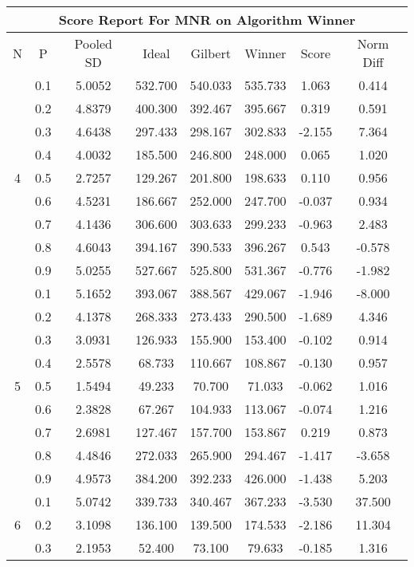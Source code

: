 \documentclass[11pt,a4paper]{report}
\begin{document}
\begin{longtable}{ | c | c || c | c | c | c | c | c | }
\hline
\multicolumn{8}{|c|}{ Score Report For MNR on Algorithm Winner} \\
\hline
N & P & Pooled SD &  Ideal &  Gilbert & Winner  & Score & Norm Diff \\
 \hline
 \hline
 \endhead
\multirow{9}{*}{4} & 0.1 & 5.0052 & 532.700 & 540.033 & 535.733 & 1.063 & 0.414 \\
 & 0.2 & 4.8379 & 400.300 & 392.467 & 395.667 & 0.319 & 0.591 \\
 & 0.3 & 4.6438 & 297.433 & 298.167 & 302.833 & -2.155 & 7.364 \\
 & 0.4 & 4.0032 & 185.500 & 246.800 & 248.000 & 0.065 & 1.020 \\
 & 0.5 & 2.7257 & 129.267 & 201.800 & 198.633 & 0.110 & 0.956 \\
 & 0.6 & 4.5231 & 186.667 & 252.000 & 247.700 & -0.037 & 0.934 \\
 & 0.7 & 4.1436 & 306.600 & 303.633 & 299.233 & -0.963 & 2.483 \\
 & 0.8 & 4.6043 & 394.167 & 390.533 & 396.267 & 0.543 & -0.578 \\
 & 0.9 & 5.0255 & 527.667 & 525.800 & 531.367 & -0.776 & -1.982 \\
 \hline
\multirow{9}{*}{5} & 0.1 & 5.1652 & 393.067 & 388.567 & 429.067 & -1.946 & -8.000 \\
 & 0.2 & 4.1378 & 268.333 & 273.433 & 290.500 & -1.689 & 4.346 \\
 & 0.3 & 3.0931 & 126.933 & 155.900 & 153.400 & -0.102 & 0.914 \\
 & 0.4 & 2.5578 & 68.733 & 110.667 & 108.867 & -0.130 & 0.957 \\
 & 0.5 & 1.5494 & 49.233 & 70.700 & 71.033 & -0.062 & 1.016 \\
 & 0.6 & 2.3828 & 67.267 & 104.933 & 113.067 & -0.074 & 1.216 \\
 & 0.7 & 2.6981 & 127.467 & 157.700 & 153.867 & 0.219 & 0.873 \\
 & 0.8 & 4.4846 & 272.033 & 265.900 & 294.467 & -1.417 & -3.658 \\
 & 0.9 & 4.9573 & 384.200 & 392.233 & 426.000 & -1.438 & 5.203 \\
 \hline
\multirow{9}{*}{6} & 0.1 & 5.0742 & 339.733 & 340.467 & 367.233 & -3.530 & 37.500 \\
 & 0.2 & 3.1098 & 136.100 & 139.500 & 174.533 & -2.186 & 11.304 \\
 & 0.3 & 2.1953 & 52.400 & 73.100 & 79.633 & -0.185 & 1.316 \\

\end{longtable}
\end{document}
